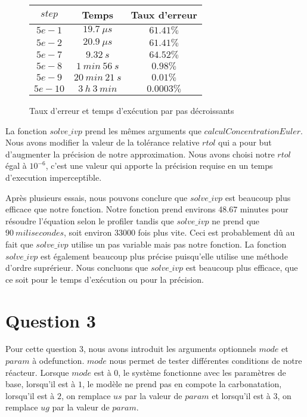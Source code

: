 \documentclass[11pt]{report}
\newcommand{\mychapter}[2]{
    \setcounter{chapter}{#1}
    \setcounter{section}{0}
    \chapter*{#2}
    \addcontentsline{toc}{chapter}{#2}
}
\begin{document}
            \begin{figure}[h]
                \centering
                \begin{tabular}{|c|c|c|}
                    \hline
                    $step$   & Temps             & Taux d'erreur\\
                    \hline
                    \hfill $5e-1$  & \hfill $19.7\ \mu s$     & \hfill $61.41\%$\\
                    \hfill $5e-2$  & \hfill $20.9\ \mu s$     & \hfill $61.41\%$\\
                    \hfill $5e-7$  & \hfill $9.32\ s$         & \hfill $64.52\%$\\
                    \hfill $5e-8$  & \hfill $1\ min\ 56\ s$   & \hfill $0.98\%$\\
                    \hfill $5e-9$  & \hfill $20\ min\ 21\ s$  & \hfill $0.01\%$\\
                    \hfill $5e-10$ & \hfill $3\ h\ 3\ min$    & \hfill $0.0003\%$\\
                    \hline
                \end{tabular}
                \caption{Taux d'erreur et temps d'exécution par pas décroissants}
                \label{tab:tol}
            \end{figure}
            \newpage
            \par
            La fonction $solve\_ivp$ prend les mêmes arguments que $calculConcentrationEuler$. 
            Nous avons modifier la valeur de la tolérance relative $rtol$ qui a pour but d'augmenter la précision de notre approximation.
            Nous avons choisi notre $rtol$ égal à $10^{-6}$, c'est une valeur qui apporte la précision requise en un temps d'execution imperceptible.
            \par
            Après plusieurs essais, nous pouvons conclure que $solve\_ivp$ est beaucoup plus efficace que notre fonction.
            Notre fonction prend environs 48.67 minutes pour résoudre l'équation selon le profiler
            tandis que $solve\_ivp$ ne prend que $90\ milisecondes$, soit environ 33000 fois plus vite.
            Ceci est probablement dû au fait que $solve\_ivp$ utilise un pas variable mais pas notre fonction.
            La fonction $solve\_ivp$ est également beaucoup plus précise puisqu'elle utilise une méthode d'ordre suprérieur.
            Nous concluons que $solve\_ivp$ est beaucoup plus efficace, que ce soit pour le temps d'exécution ou pour la précision.
    \mychapter{3}{Question 3}
        Pour cette question 3, nous avons introduit les arguments optionnels $mode$ et $param$ à odefunction.
        $mode$ nous permet de tester différentes conditions de notre réacteur.
        Lorsque $mode$ est à $0$, le système fonctionne avec les paramètres de base,
        lorsqu'il est à $1$, le modèle ne prend pas en compote la carbonatation,
        lorsqu'il est à $2$, on remplace $us$ par la valeur de $param$
        et lorsqu'il est à $3$, on remplace $ug$ par la valeur de $param$.
\end{document}
